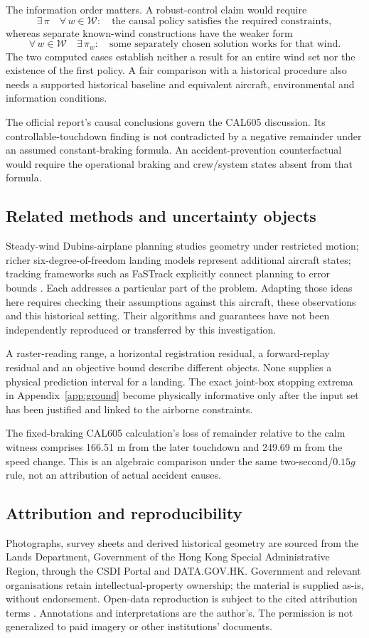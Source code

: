 The information order matters. A robust-control claim would require
\[
\exists\,\pi\quad\forall\,w\in\mathcal W:\quad
\text{the causal policy satisfies the required constraints},
\]
whereas separate known-wind constructions have the weaker form
\[
\forall\,w\in\mathcal W\quad\exists\,\pi_w:\quad
\text{some separately chosen solution works for that wind}.
\]
The two computed cases establish neither a result for an entire wind set nor the existence of the first policy. A fair comparison with a historical procedure also needs a supported historical baseline and equivalent aircraft, environmental and information conditions.

The official report's causal conclusions govern the CAL605 discussion. Its controllable-touchdown finding is not contradicted by a negative remainder under an assumed constant-braking formula. An accident-prevention counterfactual would require the operational braking and crew/system states absent from that formula.

\subsection*{Related methods and uncertainty objects}
Steady-wind Dubins-airplane planning studies geometry under restricted motion; richer six-degree-of-freedom landing models represent additional aircraft states; tracking frameworks such as FaSTrack explicitly connect planning to error bounds \citep{wu,kim,fastrack}. Each addresses a particular part of the problem. Adapting those ideas here requires checking their assumptions against this aircraft, these observations and this historical setting. Their algorithms and guarantees have not been independently reproduced or transferred by this investigation.

A raster-reading range, a horizontal registration residual, a forward-replay residual and an objective bound describe different objects. None supplies a physical prediction interval for a landing. The exact joint-box stopping extrema in Appendix~\ref{app:ground} become physically informative only after the input set has been justified and linked to the airborne constraints.

The fixed-braking CAL605 calculation's loss of remainder relative to the calm witness comprises 166.51 m from the later touchdown and 249.69 m from the speed change. This is an algebraic comparison under the same two-second/$0.15g$ rule, not an attribution of actual accident causes.

\subsection*{Attribution and reproducibility}
Photographs, survey sheets and derived historical geometry are sourced from the Lands Department, Government of the Hong Kong Special Administrative Region, through the CSDI Portal and DATA.GOV.HK. Government and relevant organisations retain intellectual-property ownership; the material is supplied as-is, without endorsement. Open-data reproduction is subject to the cited attribution terms \citep{dataterms,csditerms}. Annotations and interpretations are the author's. The permission is not generalized to paid imagery or other institutions' documents.

